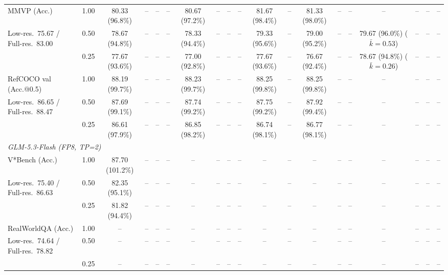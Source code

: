 \begin{table}[t]
{\begin{tabular}{l c | c c c c | c c c c | c c | c c c | c c c c}
\cmidrule(lr){1-19}
MMVP (Acc.) & 1.00 & 80.33 (96.8\%) & -- & -- & -- & 80.67 (97.2\%) & -- & -- & -- & \cellcolor{gray!15}81.67 (98.4\%) & -- & 81.33 (98.0\%) & -- & -- & -- & -- & -- & -- \\
{\footnotesize Low-res.\ 75.67 / Full-res.\ 83.00} & 0.50 & 78.67 (94.8\%) & -- & -- & -- & 78.33 (94.4\%) & -- & -- & -- & 79.33 (95.6\%) & -- & 79.00 (95.2\%) & -- & -- & 79.67 (96.0\%) {\footnotesize ($\bar k{=}0.53$)} & -- & -- & -- \\
 & 0.25 & 77.67 (93.6\%) & -- & -- & -- & 77.00 (92.8\%) & -- & -- & -- & 77.67 (93.6\%) & -- & 76.67 (92.4\%) & -- & -- & 78.67 (94.8\%) {\footnotesize ($\bar k{=}0.26$)} & -- & -- & -- \\
\cmidrule(lr){1-19}
RefCOCO val (Acc.@0.5) & 1.00 & \cellcolor{gray!15}88.19 (99.7\%) & -- & -- & -- & \cellcolor{gray!15}88.23 (99.7\%) & -- & -- & -- & \cellcolor{gray!15}88.25 (99.8\%) & -- & \cellcolor{gray!15}88.25 (99.8\%) & -- & -- & -- & -- & -- & -- \\
{\footnotesize Low-res.\ 86.65 / Full-res.\ 88.47} & 0.50 & \cellcolor{gray!15}87.69 (99.1\%) & -- & -- & -- & \cellcolor{gray!15}87.74 (99.2\%) & -- & -- & -- & \cellcolor{gray!15}87.75 (99.2\%) & -- & \cellcolor{gray!15}87.92 (99.4\%) & -- & -- & -- & -- & -- & -- \\
 & 0.25 & 86.61 (97.9\%) & -- & -- & -- & \cellcolor{gray!15}86.85 (98.2\%) & -- & -- & -- & \cellcolor{gray!15}86.74 (98.1\%) & -- & \cellcolor{gray!15}86.77 (98.1\%) & -- & -- & -- & -- & -- & -- \\
\midrule
\multicolumn{19}{l}{\emph{GLM-5.3-Flash (FP8, TP=2)}} \\
V*Bench (Acc.) & 1.00 & \cellcolor{gray!15}87.70 (101.2\%) & -- & -- & -- & -- & -- & -- & -- & -- & -- & -- & -- & -- & -- & -- & -- & -- \\
{\footnotesize Low-res.\ 75.40 / Full-res.\ 86.63} & 0.50 & 82.35 (95.1\%) & -- & -- & -- & -- & -- & -- & -- & -- & -- & -- & -- & -- & -- & -- & -- & -- \\
 & 0.25 & 81.82 (94.4\%) & -- & -- & -- & -- & -- & -- & -- & -- & -- & -- & -- & -- & -- & -- & -- & -- \\
\cmidrule(lr){1-19}
RealWorldQA (Acc.) & 1.00 & -- & -- & -- & -- & -- & -- & -- & -- & -- & -- & -- & -- & -- & -- & -- & -- & -- \\
{\footnotesize Low-res.\ 74.64 / Full-res.\ 78.82} & 0.50 & -- & -- & -- & -- & -- & -- & -- & -- & -- & -- & -- & -- & -- & -- & -- & -- & -- \\
 & 0.25 & -- & -- & -- & -- & -- & -- & -- & -- & -- & -- & -- & -- & -- & -- & -- & -- & -- \\

\end{tabular}}
\end{table}
